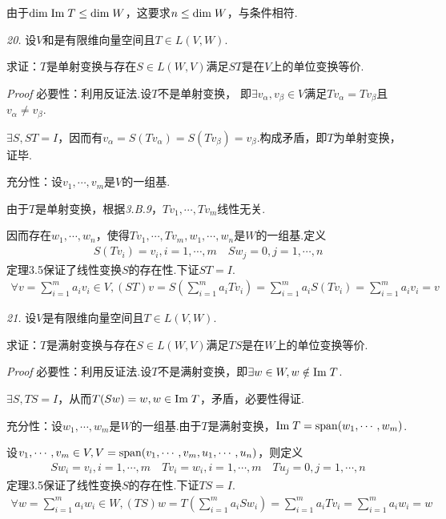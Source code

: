 由于\(\mathrm{dim \;} \mathrm{Im \;} T\leq \mathrm{dim \;} W\)，这要求\(n\leq \mathrm{dim \;} W\)，与条件相符.

\hspace*{\fill}

\textit{20.}
设\(V\)和是有限维向量空间且\(T\in L(V,W)\).

求证：\(T\)是单射变换与存在\(S\in L(W,V)\)满足\(ST\)是在\(V\)上的单位变换等价.

\textit{Proof}
必要性：利用反证法.设\(T\)不是单射变换，
即\(\exists v_\alpha,v_\beta \in V\)满足\(Tv_\alpha=Tv_\beta\)且\(v_\alpha \ne v_\beta\).

\(\exists S,ST=I\)，因而有\(v_\alpha=S(Tv_\alpha)=S(Tv_\beta)=v_\beta\).构成矛盾，即\(T\)为单射变换，证毕.

充分性：设\(v_1,\cdots,v_m\)是\(V\)的一组基.

由于\(T\)是单射变换，根据\textit{3.B.9}，\(Tv_1,\cdots,Tv_m\)线性无关.

因而存在\(w_1,\cdots,w_n\)，使得\(Tv_1,\cdots,Tv_m,w_1,\cdots,w_n\)是\(W\)的一组基.定义
    \begin{align*}
        S(Tv_i)=v_i,i=1,\cdots,m \quad Sw_j=0,j=1,\cdots,n
    \end{align*}
定理3.5保证了线性变换\(S\)的存在性.下证\(ST=I\).
    \begin{align*}
        \forall v=\sum_{i=1}^m a_iv_i\in V,(ST)v=S(\sum_{i=1}^m a_iTv_i)
        =\sum_{i=1}^m a_iS(Tv_i)=\sum_{i=1}^m a_iv_i=v
    \end{align*}

\newpage

\textit{21.}
设\(V\)是有限维向量空间且\(T\in L(V,W)\).

求证：\(T\)是满射变换与存在\(S\in L(W,V)\)满足\(TS\)是在\(W\)上的单位变换等价.

\textit{Proof}
必要性：利用反证法.设\(T\)不是满射变换，即\(\exists w\in W,w\notin \mathrm{Im \;} T\).

\(\exists S,TS=I\)，从而\(T(Sw)=w,w\in \mathrm{Im \;} T\)，矛盾，必要性得证.

充分性：设\(w_1,\cdots,w_m\)是\(W\)的一组基.由于\(T\)是满射变换，\(\mathrm{Im \;} T=\mathrm{span} (w_1,\cdots,w_m)\).

设\(v_1,\cdots,v_m\in V,V=\mathrm{span} (v_1,\cdots,v_m,u_1,\cdots,u_n)\)，则定义
    \begin{align*}
        Sw_i=v_i,i=1,\cdots,m \quad
        Tv_i=w_i,i=1,\cdots,m \quad Tu_j=0,j=1,\cdots,n
    \end{align*}
定理3.5保证了线性变换\(S\)的存在性.下证\(TS=I\).
    \begin{align*}
        \forall w=\sum_{i=1}^m a_iw_i\in W,(TS)w=T(\sum_{i=1}^m a_iSw_i) 
        =\sum_{i=1}^m a_iTv_i=\sum_{i=1}^m a_iw_i=w
    \end{align*}

